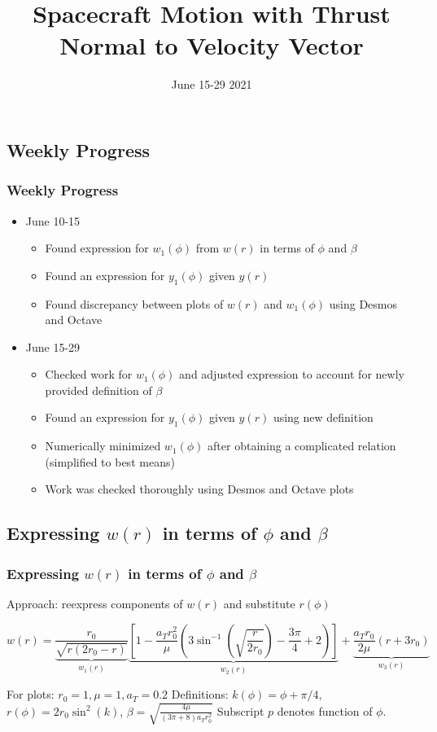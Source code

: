 \documentclass{beamer}
\title{Spacecraft Motion with Thrust Normal to Velocity Vector}
\date{June 15-29 2021}
\newcommand{\sectit}[1]{
    \section{\texorpdfstring{#1}{}}
    \frametitle{#1}
}
\begin{document}
\frame{\titlepage}

\begin{frame}

\sectit{Weekly Progress}

\begin{itemize}
    \item June 10-15
    \begin{itemize}
        \item Found expression for $w_1(\phi)$ from $w(r)$ in terms of $\phi$ and $\beta$
        \item Found an expression for $y_1(\phi)$ given $y(r)$
        \item Found discrepancy between plots of $w(r)$ and $w_1(\phi)$ using Desmos and Octave
    \end{itemize}
    \item June 15-29
    \begin{itemize}
        \item Checked work for $w_1(\phi)$ and adjusted expression to account for newly provided definition of $\beta$
        \item Found an expression for $y_1(\phi)$ given $y(r)$ using new definition
        \item Numerically minimized $w_1(\phi)$ after obtaining a complicated relation (simplified to best means)
        \item Work was checked thoroughly using Desmos and Octave plots
    \end{itemize}
\end{itemize}

\end{frame}

\begin{frame}
    \sectit{Expressing $w(r)$ in terms of $\phi$ and $\beta$}

    Approach: reexpress components of $w(r)$ and substitute $r(\phi)$

    
    {\scriptsize{$$
    w(r)=\underbrace{\frac{r_{0}}{\sqrt{r\left(2 r_{0}-r\right)}}}_{w_1(r)}
        \underbrace{\left[1-\frac{a_{T} r_{0}^{2}}{\mu}\left(3 \sin ^{-1}\left(\sqrt{\frac{r}{2 r_{0}}}\right)-\frac{3 \pi}{4}+2\right)\right]}_{w_2(r)}
        +\underbrace{\frac{a_{T} r_{0}}{2 \mu}\left(r+3 r_{0}\right)}_{w_3(r)}
    $$}}

    For plots: $r_0=1, \mu=1, a_T=0.2$\newline
    Definitions: $k(\phi)=\phi+\pi/4$, $r(\phi)=2r_0\sin^2(k)$, $\beta=\sqrt{\frac{4\mu}{(3\pi+8)a_Tr_0^2}}$\newline
    Subscript $p$ denotes function of $\phi$.

\end{frame}
\end{document}
